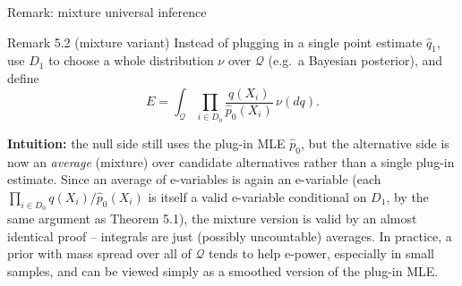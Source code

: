 \documentclass[aspectratio=169,10pt]{beamer}
\newcommand{\calQ}{\mathcal{Q}}
\begin{document}
\begin{frame}{Remark: mixture universal inference}

  \begin{block}{Remark 5.2 (mixture variant)}
    Instead of plugging in a single point estimate $\hat q_1$, use
    $D_1$ to choose a whole distribution $\nu$ over $\calQ$ (e.g.\ a
    Bayesian posterior), and define
    $$ E = \int_\calQ \prod_{i\in D_0} \frac{q(X_i)}{\hat p_0(X_i)}\, \nu(dq). $$
  \end{block}

  \textbf{Intuition:} the null side still uses the plug-in MLE
  $\hat p_0$, but the alternative side is now an \emph{average}
  (mixture) over candidate alternatives rather than a single plug-in
  estimate. Since an average of e-variables is again an e-variable
  (each $\prod_{i\in D_0} q(X_i)/\hat p_0(X_i)$ is itself a valid
  e-variable conditional on $D_1$, by the same argument as Theorem
  5.1), the mixture version is valid by an almost identical proof --
  integrals are just (possibly uncountable) averages. In practice, a
  prior with mass spread over all of $\calQ$ tends to help e-power,
  especially in small samples, and can be viewed simply as a smoothed
  version of the plug-in MLE.

\end{frame}
\end{document}
